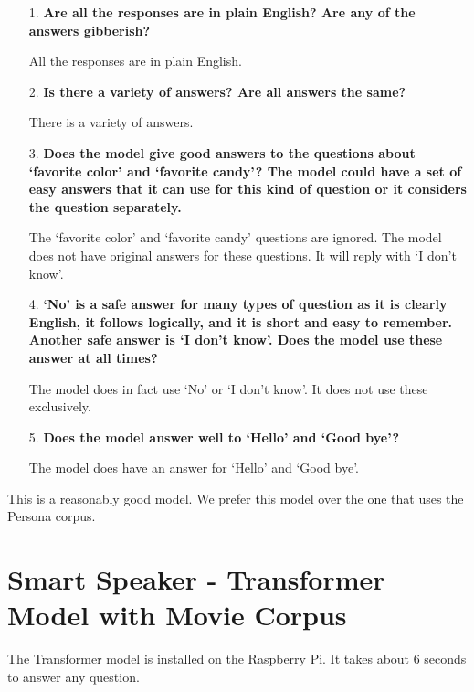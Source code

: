 \begin{itemize}
	\item [1.] \textbf{Are all the responses are in plain English? Are any of the answers gibberish?}
	
	\item []All the responses are in plain English. 
	
	\item [2.] \textbf{Is there a  variety of answers? Are all answers the same?}
	
	\item []There is a variety of answers. 
	
	\item [3.] \textbf{Does the model give good answers to the questions about `favorite color' and `favorite candy'? The model could have a set of easy answers that it can use for this kind of question or it considers the question separately. }
	
	\item []The `favorite color' and `favorite candy' questions are ignored. The model does not have original answers for these questions. It will reply with `I don't know'.
	
	\item [4.] \textbf{`No' is a safe answer for many types of question as it is clearly English, it follows logically, and it is short and easy to remember. Another safe answer is `I don't know'. Does the model use these answer at all times?}
	
	\item []The model does in fact use `No' or `I don't know'. It does not use these exclusively.
	
	\item [5.] \textbf{Does the model answer well to `Hello' and `Good bye'?}
	
	\item []The model does have an answer for `Hello' and `Good bye'.
\end{itemize}

This is a reasonably good model. We prefer this model over the one that uses the Persona corpus.

\section{Smart Speaker - Transformer Model with Movie Corpus}

The Transformer model is installed on the Raspberry Pi. It takes about 6 seconds to answer any question.

